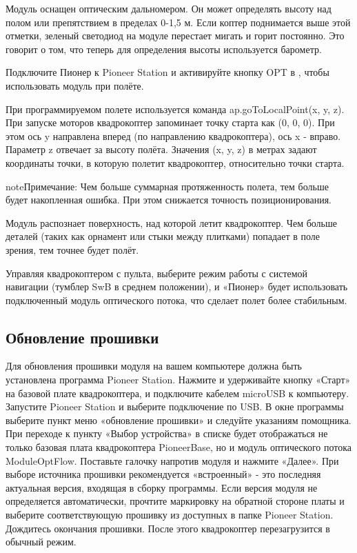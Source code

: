 \documentclass[a4paper,10pt,russian]{sphinxmanual}
\begin{document}
Модуль оснащен оптическим дальномером. Он может определять высоту над полом или препятствием в пределах 0-1,5 м. Если коптер поднимается выше этой отметки, зеленый светодиод на модуле перестает мигать и горит постоянно. Это говорит о том, что теперь для определения высоты используется барометр.

Подключите Пионер к Pioneer Station и активируйте кнопку OPT в , чтобы использовать модуль при полёте.

При программируемом полете используется команда ap.goToLocalPoint(x, y, z). При запуске моторов квадрокоптер запоминает точку старта как (0, 0, 0). При этом ось y направлена вперед (по направлению квадрокоптера), ось x - вправо. Параметр z отвечает за высоту полёта. Значения (x, y, z) в метрах задают координаты точки, в которую полетит квадрокоптер, относительно точки старта.

\begin{sphinxadmonition}{note}{Примечание:}
Чем больше суммарная протяженность полета, тем больше будет накопленная ошибка. При этом снижается точность позиционирования.
\end{sphinxadmonition}

Модуль распознает поверхность, над которой летит квадрокоптер. Чем больше деталей (таких как орнамент или стыки между плитками) попадает в поле зрения, тем точнее будет полёт.

Управляя квадрокоптером с пульта, выберите режим работы с системой навигации (тумблер SwB в среднем положении), и «Пионер» будет использовать подключенный модуль оптического потока, что сделает полет более стабильным.


\subsection{Обновление прошивки}
\label{\detokenize{module/optic:id2}}
Для обновления прошивки модуля на вашем компьютере должна быть установлена программа Pioneer Station. Нажмите и удерживайте кнопку «Старт» на базовой плате квадрокоптера, и подключите кабелем microUSB к компьютеру. Запустите Pioneer Station и выберите подключение по USB. В окне программы выберите пункт меню «обновление прошивки» и следуйте указаниям помощника.
При переходе к пункту «Выбор устройства» в списке будет отображаться не только базовая плата квадрокоптера PioneerBase, но и модуль оптического потока ModuleOptFlow. Поставьте галочку напротив модуля и нажмите «Далее».
При выборе источника прошивки рекомендуется «встроенный» - это последняя актуальная версия, входящая в сборку программы.
Если версия модуля не определяется автоматически, прочтите маркировку на обратной стороне платы и выберите соответствующую прошивку из доступных в папке Pioneer Station.
Дождитесь окончания прошивки. После этого квадрокоптер перезагрузится в обычный режим.
\end{document}
